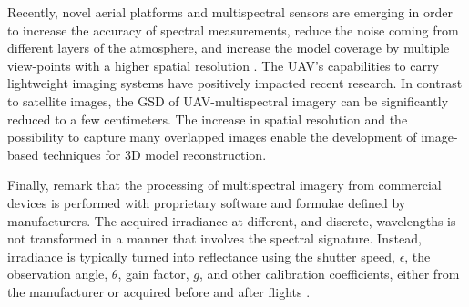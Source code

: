Recently, novel aerial platforms and multispectral sensors are emerging in order to increase the accuracy of spectral measurements, reduce the noise coming from different layers of the atmosphere, and increase the model coverage by multiple view-points with a higher spatial resolution \cite{deng_uav-based_2018}. The UAV’s capabilities to carry lightweight imaging systems have positively impacted recent research. In contrast to satellite images, the GSD of UAV-multispectral imagery can be significantly reduced to a few centimeters. The increase in spatial resolution and the possibility to capture many overlapped images enable the development of image-based techniques for 3D model reconstruction.

Finally, remark that the processing of multispectral imagery from commercial devices is performed with proprietary software and formulae defined by manufacturers. The acquired irradiance at different, and discrete, wavelengths is not transformed in a manner that involves the spectral signature. Instead, irradiance is typically turned into reflectance using the shutter speed, $\epsilon$, the observation angle, $\theta$, gain factor, $g$, and other calibration coefficients, either from the manufacturer or acquired before and after flights \cite{jurado_semantic_2020, candiago_evaluating_2015}.

